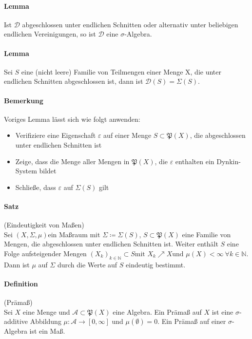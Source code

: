\documentclass[12pt,a4paper,fleqn]{article}
\begin{document}
\paragraph{Lemma} Ist $\mathcal{D}$ abgeschlossen unter endlichen Schnitten oder alternativ unter beliebigen endlichen Vereinigungen, so ist $\mathcal{D}$ eine $\sigma$-Algebra.

\paragraph{Lemma} Sei $S$ eine (nicht leere) Familie von Teilmengen einer Menge X, die unter endlichen Schnitten abgeschlossen ist, dann ist $\mathcal{D}(S) = \Sigma(S)$.

\paragraph{Bemerkung} Voriges Lemma lässt sich wie folgt anwenden:
\begin{itemize}
\item Verifiziere eine Eigenschaft $\varepsilon$ auf einer Menge $S \subset \mathfrak{P}(X)$, die abgeschlossen unter endlichen Schnitten ist
\item Zeige, dass die Menge aller Mengen in $\mathfrak{P}(X)$, die $\varepsilon$ enthalten ein Dynkin-System bildet
\item Schließe, dass $\varepsilon$ auf $\Sigma(S)$ gilt
\end{itemize} 

\paragraph{Satz}(Eindeutigkeit von Maßen)\\
Sei $(X, \Sigma, \mu)$ein Maßraum mit $\Sigma \coloneqq \Sigma(S)$, $S \subset \mathfrak{P}(X)$ eine Familie von Mengen, die abgeschlossen unter endlichen Schnitten ist. Weiter enthält $S$ eine Folge aufsteigender Mengen $(X_k)_{k \in \mathbb{N}} \subset S \text{mit } X_k \nearrow X \text{und } \mu(X) < \infty \ \forall k \in \mathbb{N}$. Dann ist $\mu$ auf $\Sigma$ durch die Werte auf $S$ eindeutig bestimmt.

\paragraph{Definition} (Prämaß)\\
Sei $X$ eine Menge und $\mathcal{A} \subset \mathfrak{P}(X)$ eine Algebra. Ein Prämaß auf $X$ ist eine $\sigma$-additive Abbildung $\mu\colon\mathcal{A} \rightarrow [0, \infty]$ und $\mu(\emptyset) = 0$. Ein Prämaß auf einer $\sigma$-Algebra ist ein Maß.
\end{document}
